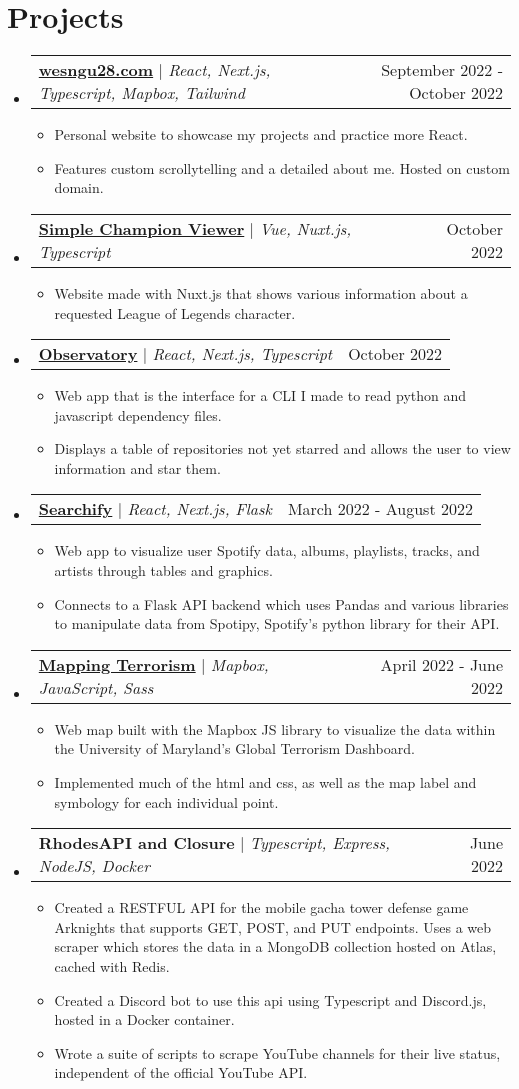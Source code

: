 \documentclass[letterpaper,11pt]{article}
\makeatletter
\newcommand{\resumeItem}[1]{
  \item\small{
    {#1 \vspace{-2pt}}
  }
}
\newcommand{\resumeProjectHeading}[2]{
    \item
    \begin{tabular*}{0.97\textwidth}{l@{\extracolsep{\fill}}r}
      \small#1 & #2 \\
    \end{tabular*}\vspace{-7pt}
}
\newcommand{\resumeSubHeadingListStart}{\begin{itemize}[leftmargin=0.15in, label={}]}
\newcommand{\resumeSubHeadingListEnd}{\end{itemize}}
\newcommand{\resumeItemListStart}{\begin{itemize}}
\newcommand{\resumeItemListEnd}{\end{itemize}\vspace{-5pt}}
\makeatother
\begin{document}
\section{Projects}
    \vspace{-5pt}
    \resumeSubHeadingListStart
      \resumeProjectHeading
          {\textbf{\href{https://wesngu28.com}{wesngu28.com}} $|$ \emph{React, Next.js, Typescript, Mapbox, Tailwind}}{September 2022 - October 2022}
          \resumeItemListStart
            \resumeItem{Personal website to showcase my projects and practice more React.}
            \resumeItem{Features custom scrollytelling and a detailed about me. Hosted on custom domain.}
          \resumeItemListEnd
      \resumeProjectHeading
          {\textbf{\href{https://simplechampionviewer.vercel.app/}{Simple Champion Viewer}} $|$ \emph{Vue, Nuxt.js, Typescript}}{October 2022}
          \resumeItemListStart
            \resumeItem{Website made with Nuxt.js that shows various information about a requested League of Legends character.}
          \resumeItemListEnd
      \resumeProjectHeading
          {\textbf{\href{https://observatories.vercel.app/}{Observatory}} $|$ \emph{React, Next.js, Typescript}}{October 2022}
          \resumeItemListStart
            \resumeItem{Web app that is the interface for a CLI I made to read python and javascript dependency files.}
            \resumeItem{Displays a table of repositories not yet starred and allows the user to view information and star them.}
          \resumeItemListEnd
      \resumeProjectHeading
          {\textbf{\href{https://searchifyy.vercel.app/}{Searchify}} $|$ \emph{React, Next.js, Flask}}{March 2022 - August 2022}
          \resumeItemListStart
            \resumeItem{Web app to visualize user Spotify data, albums, playlists, tracks, and artists through tables and graphics.}
            \resumeItem{Connects to a Flask API backend which uses Pandas and various libraries to manipulate data from Spotipy, Spotify's python library for their API.}
          \resumeItemListEnd
      \resumeProjectHeading
          {\textbf{\href{https://wesngu28.github.io/mapping-terrorism/}{Mapping Terrorism}} $|$ \emph{Mapbox, JavaScript, Sass}}{April 2022 - June 2022}
          \resumeItemListStart
            \resumeItem{Web map built with the Mapbox JS library to visualize the data within the University of Maryland's Global Terrorism Dashboard.}
            \resumeItem{Implemented much of the html and css, as well as the map label and symbology for each individual point.}
          \resumeItemListEnd
        \resumeProjectHeading
          {\textbf{RhodesAPI and Closure} $|$ \emph{Typescript, Express, NodeJS, Docker}}{June 2022}
          \resumeItemListStart
            \resumeItem{Created a RESTFUL API for the mobile gacha tower defense game Arknights that supports GET, POST, and PUT endpoints. Uses a web scraper which stores the data in a MongoDB collection hosted on Atlas, cached with Redis.}
            \resumeItem{Created a Discord bot to use this api using Typescript and Discord.js, hosted in a Docker container.}
            \resumeItem{Wrote a suite of scripts to scrape YouTube channels for their live status, independent of the official YouTube API.}
          \resumeItemListEnd
    \resumeSubHeadingListEnd
\vspace{-15pt}
\end{document}
